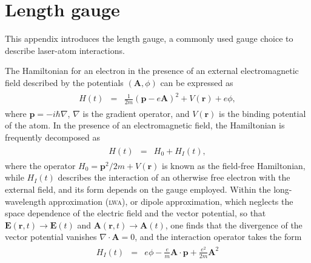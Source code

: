 \chapter{Length gauge}
\label{app:L_gauge}

This appendix introduces the length gauge, a commonly used gauge
choice to describe laser-atom interactions.

The Hamiltonian for an electron in the presence of an external
electromagnetic field described by the potentials $(\mathbf{A},\phi)$
can be expressed as
%
\begin{eqnarray}
  \label{eq:H_lgauge}
  \begin{split}
    H(t) & = & \frac{1}{2m}(\mathbf{p} - e\mathbf{A})^{2}
    + V(\mathbf{r}) + e\phi,
  \end{split}
\end{eqnarray}
%
where $\mathbf{p} = -i\hbar\nabla$, $\nabla$ is the gradient operator,
and $V(\mathbf{r})$ is the binding potential of the atom. In the
presence of an electromagnetic field, the Hamiltonian is frequently
decomposed as
%
\begin{eqnarray}
  \label{eq:H_decomposed}
  \begin{split}
    H(t) & = & H_{0} + H_{I}(t),
  \end{split}
\end{eqnarray}
%
where the operator $H_{0} = \mathbf{p}^{2}/2m + V(\mathbf{r})$ is
known as the field-free Hamiltonian, while $H_{I}(t)$ describes the
interaction of an otherwise free electron with the external field, and
its form depends on the gauge employed. Within the long-wavelength
approximation (\textsc{lwa}), or dipole approximation, which neglects
the space dependence of the electric field and the vector potential,
so that $\mathbf{E}(\mathbf{r}, t) \to \mathbf{E}(t)$ and
$\mathbf{A}(\mathbf{r}, t) \to \mathbf{A}(t)$, one finds that the
divergence of the vector potential vanishes $\nabla\cdot\mathbf{A} =
0$, and the interaction operator takes the form
%
\begin{eqnarray}
  \label{eq:H_dipole}
  \begin{split}
    H_{I}(t) & = & e\phi -
    \frac{e}{m}\mathbf{A}\cdot\mathbf{p} + \frac{e^{2}}{2m}\mathbf{A}^{2}
  \end{split}
\end{eqnarray}
%

